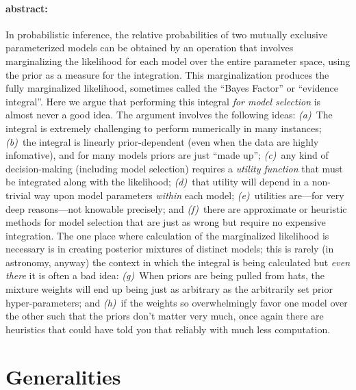 \documentclass[12pt,twoside]{article}
\begin{document}
\paragraph{abstract:}
In probabilistic inference,
  the relative probabilities of two mutually exclusive parameterized models
  can be obtained by an operation that involves marginalizing the likelihood for each model
  over the entire parameter space,
  using the prior as a measure for the integration.
This marginalization produces the fully marginalized likelihood,
  sometimes called the ``Bayes Factor'' or ``evidence integral''.
Here we argue that performing this integral \emph{for model selection}
  is almost never a good idea.
The argument involves the following ideas:
  \textsl{(a)}~The integral is extremely challenging to perform numerically in many instances;
  \textsl{(b)}~the integral is linearly prior-dependent (even when the data are highly infomative),
  and for many models priors are just ``made up'';
  \textsl{(c)}~any kind of decision-making (including model selection) requires a \emph{utility function}
  that must be integrated along with the likelihood;
  \textsl{(d)}~that utility will depend in a non-trivial way upon model parameters \emph{within} each model;
  \textsl{(e)}~utilities are---for very deep reasons---not knowable precisely; and
  \textsl{(f)}~there are approximate or heuristic methods for model selection
  that are just as wrong but require no expensive integration.
The one place where calculation of the marginalized likelihood is necessary
  is in creating posterior mixtures of distinct models;
  this is rarely (in astronomy, anyway) the context in which the integral is being calculated
  but \emph{even there} it is often a bad idea:
  \textsl{(g)}~When priors are being pulled from hats,
  the mixture weights will end up being just as arbitrary as the arbitrarily set prior hyper-parameters; and
  \textsl{(h)}~if the weights so overwhelmingly favor one model over the other
  such that the priors don't matter very much,
  once again there are heuristics that could have told you that reliably with much less computation.

\section{Generalities}
\end{document}
